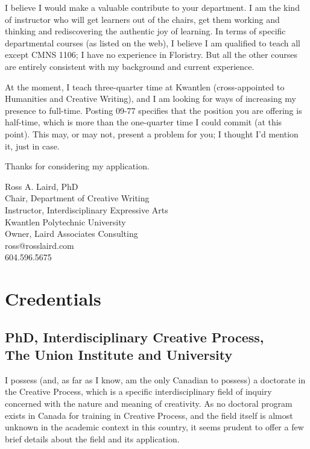 \documentclass[10pt,DIV09,letterpaper,oneside,headsepline]{scrreprt}
\begin{document}
I believe I would make a valuable contribute to your department. I am the kind of instructor who will get learners out of the chairs, get them working and thinking and rediscovering the authentic joy of learning. In terms of specific departmental courses (as listed on the web), I believe I am qualified to teach all except CMNS 1106; I have no experience in Floristry. But all the other courses are entirely consistent with my background and current experience.

At the moment, I teach three-quarter time at Kwantlen (cross-appointed to Humanities and Creative Writing), and I am looking for ways of increasing my presence to full-time. Posting 09-77 specifies that the position you are offering is half-time, which is more than the one-quarter time I could commit (at this point). This may, or may not, present a problem for you; I thought I'd mention it, just in case.


Thanks for considering my application.

\vspace{.10in}
\begin{flushleft}
Ross A. Laird, PhD\\
Chair, Department of Creative Writing\\
Instructor, Interdisciplinary Expressive Arts\\
Kwantlen Polytechnic University\\
Owner, Laird Associates Consulting\\
ross@rosslaird.com\\
604.596.5675
\end{flushleft}

\chapter{Credentials}

\section{PhD, Interdisciplinary Creative Process,\\ The Union Institute and University}

I possess (and, as far as I know, am the only Canadian to possess) a doctorate in the Creative Process, which is a specific interdisciplinary field of inquiry concerned with the nature and meaning of creativity. As no doctoral program exists in Canada for training in Creative Process, and the field itself is almost unknown in the academic context in this country, it seems prudent to offer a few brief details about the field and its application.
\end{document}

